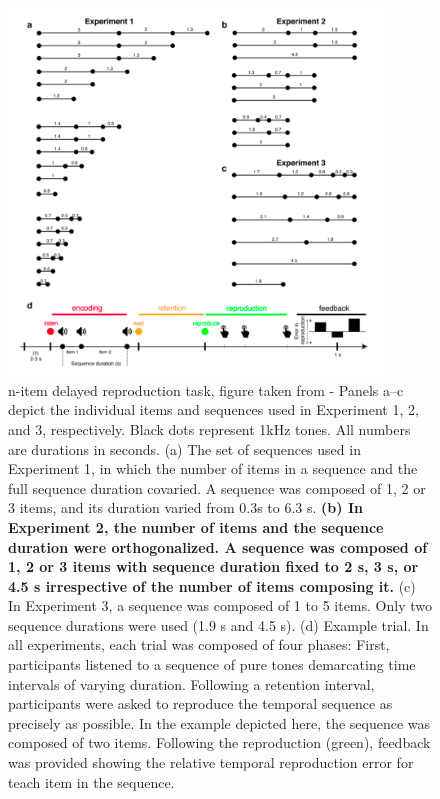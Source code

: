  
\begin{figure}[ht]
   \centering
   \includegraphics[width=10cm]{images_report/n-item delayed reproduction task.png}
   \caption[n-item delayed reproduction task]%
   {n-item delayed reproduction task, figure taken from \cite{herbst2021abstracting} - Panels a–c depict the individual items and sequences used in Experiment 1, 2, and 3, respectively. Black dots represent 1kHz tones. All numbers are durations in seconds. (a) The set of sequences used in Experiment 1, in which the number of items in a sequence and the full sequence duration covaried. A sequence was composed of 1, 2 or 3 items, and its duration varied from 0.3s to 6.3 s. \textbf{(b) In Experiment 2, the number of items and the sequence duration were orthogonalized. A sequence was composed of 1, 2 or 3 items with sequence duration fixed to 2 s, 3 s, or 4.5 s irrespective of the number of items composing it.} (c) In Experiment 3, a sequence was composed of 1 to 5 items. Only two sequence durations were used (1.9 s and 4.5 s). (d) Example trial. In all experiments, each trial was composed of four phases: First, participants listened to a sequence of pure tones demarcating time intervals of varying duration. Following a retention interval, participants were asked to reproduce the temporal sequence as precisely as possible. In the example depicted here, the sequence was composed of two items. Following the reproduction (green), feedback was provided showing the relative temporal reproduction error for teach item in the sequence.}
 
   \label{paradigm}
\end{figure}
 
